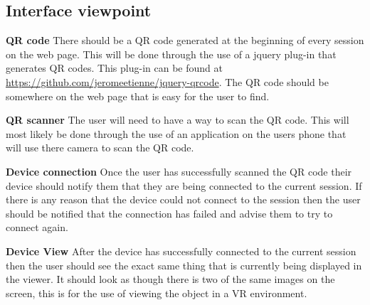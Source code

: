 \documentclass[letterpaper, 10pt, draftclsnofoot, compsoc, onecolumn]{IEEEtran}
\begin{document}
\subsection{Interface viewpoint}
\begin{description}
	\item\textbf{QR code} There should be a QR code generated at the beginning of every session on the web page. This will be done through the use of a jquery plug-in that generates QR codes. This plug-in can be found at \href{https://github.com/jeromeetienne/jquery-qrcode}{https://github.com/jeromeetienne/jquery-qrcode}. The QR code should be somewhere on the web page that is easy for the user to find. 
	\item\textbf{QR scanner} The user will need to have a way to scan the QR code. This will most likely be done through the use of an application on the users phone that will use there camera to scan the QR code.
	\item\textbf{Device connection} Once the user has successfully scanned the QR code their device should notify them that they are being connected to the current session. If there is any reason that the device could not connect to the session then the user should be notified that the connection has failed and advise them to try to connect again.
	\item\textbf{Device View} After the device has successfully connected to the current session then the user should see the exact same thing that is currently being displayed in the viewer. It should look as though there is two of the same images on the screen, this is for the use of viewing the object in a VR environment.  
\end{description}



\end{document}
